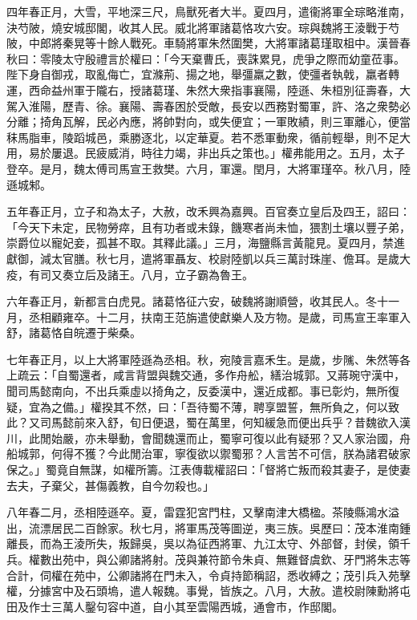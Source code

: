 \begin{pinyinscope}
四年春正月，大雪，平地深三尺，鳥獸死者大半。夏四月，遣衞將軍全琮略淮南，決芍陂，燒安城邸閣，收其人民。威北將軍諸葛恪攻六安。琮與魏將王淩戰于芍陂，中郎將秦晃等十餘人戰死。車騎將軍朱然圍樊，大將軍諸葛瑾取柤中。漢晉春秋曰：零陵太守殷禮言於權曰：「今天棄曹氏，喪誅累見，虎爭之際而幼童莅事。陛下身自御戎，取亂侮亡，宜滌荊、揚之地，舉彊羸之數，使彊者執戟，羸者轉運，西命益州軍于隴右，授諸葛瑾、朱然大衆指事襄陽，陸遜、朱桓別征壽春，大駕入淮陽，歷青、徐。襄陽、壽春困於受敵，長安以西務對蜀軍，許、洛之衆勢必分離；掎角瓦解，民必內應，將帥對向，或失便宜；一軍敗績，則三軍離心，便當秣馬脂車，陵蹈城邑，乘勝逐北，以定華夏。若不悉軍動衆，循前輕舉，則不足大用，易於屢退。民疲威消，時往力竭，非出兵之策也。」權弗能用之。五月，太子登卒。是月，魏太傅司馬宣王救樊。六月，軍還。閏月，大將軍瑾卒。秋八月，陸遜城邾。

五年春正月，立子和為太子，大赦，改禾興為嘉興。百官奏立皇后及四王，詔曰：「今天下未定，民物勞瘁，且有功者或未錄，饑寒者尚未恤，猥割土壤以豐子弟，崇爵位以寵妃妾，孤甚不取。其釋此議。」三月，海鹽縣言黃龍見。夏四月，禁進獻御，減太官膳。秋七月，遣將軍聶友、校尉陸凱以兵三萬討珠崖、儋耳。是歲大疫，有司又奏立后及諸王。八月，立子霸為魯王。

六年春正月，新都言白虎見。諸葛恪征六安，破魏將謝順營，收其民人。冬十一月，丞相顧雍卒。十二月，扶南王范旃遣使獻樂人及方物。是歲，司馬宣王率軍入舒，諸葛恪自皖遷于柴桑。

七年春正月，以上大將軍陸遜為丞相。秋，宛陵言嘉禾生。是歲，步隲、朱然等各上疏云：「自蜀還者，咸言背盟與魏交通，多作舟舩，繕治城郭。又蔣琬守漢中，聞司馬懿南向，不出兵乘虛以掎角之，反委漢中，還近成都。事已彰灼，無所復疑，宜為之備。」權揆其不然，曰：「吾待蜀不薄，聘享盟誓，無所負之，何以致此？又司馬懿前來入舒，旬日便退，蜀在萬里，何知緩急而便出兵乎？昔魏欲入漢川，此閒始嚴，亦未舉動，會聞魏還而止，蜀寧可復以此有疑邪？又人家治國，舟船城郭，何得不獲？今此閒治軍，寧復欲以禦蜀邪？人言苦不可信，朕為諸君破家保之。」蜀竟自無謀，如權所籌。江表傳載權詔曰：「督將亡叛而殺其妻子，是使妻去夫，子棄父，甚傷義教，自今勿殺也。」

八年春二月，丞相陸遜卒。夏，雷霆犯宮門柱，又擊南津大橋楹。茶陵縣鴻水溢出，流漂居民二百餘家。秋七月，將軍馬茂等圖逆，夷三族。吳歷曰：茂本淮南鍾離長，而為王淩所失，叛歸吳，吳以為征西將軍、九江太守、外部督，封侯，領千兵。權數出苑中，與公卿諸將射。茂與兼符節令朱貞、無難督虞欽、牙門將朱志等合計，伺權在苑中，公卿諸將在門未入，令貞持節稱詔，悉收縛之；茂引兵入苑擊權，分據宮中及石頭塢，遣人報魏。事覺，皆族之。八月，大赦。遣校尉陳勳將屯田及作士三萬人鑿句容中道，自小其至雲陽西城，通會巿，作邸閣。


\end{pinyinscope}
